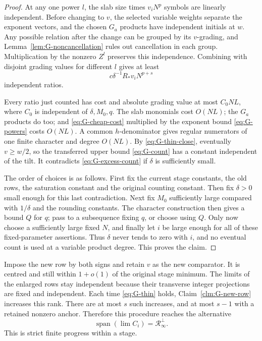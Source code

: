 \begin{proof}
At any one power $l$, the slab size times $v_iN^p$ symbols are linearly
independent.  Before changing to $v$, the selected variable weights
separate the exponent vectors, and the chosen $G_a$ products have
independent initials at $w$.  Any possible relation after the change
can be grouped by its $v$-grading, and
Lemma~\ref{lem:G-noncancellation} rules out cancellation in each group.
Multiplication by the nonzero $Z^l$ preserves this independence.
Combining with disjoint grading values for different $l$ gives at least
\begin{equation}\label{eq:G-excess-count}
                     c\delta^{-1}R_*v_iN^{p+s}
\end{equation}
independent ratios.

Every ratio just counted has cost and absolute grading value at most
$C_0NL$, where $C_0$ is independent of $\delta,M_0,q$.  The slab
monomials cost $O(NL)$; the $G_a$ products do too; and
\eqref{eq:G-cheap-cost} multiplied by the exponent bound
\eqref{eq:G-powers} costs $O(NL)$.  A common $h$-denominator gives
regular numerators of one finite character and degree $O(NL)$.
By \eqref{eq:G-thin-close}, eventually $v\ge w/2$, so the transferred
upper bound \eqref{eq:G-count} has a constant independent of the tilt.
It contradicts \eqref{eq:G-excess-count} if $\delta$ is sufficiently
small.

The order of choices is as follows.  First fix the current stage
constants, the old rows, the saturation constant and the original
counting constant.  Then fix $\delta>0$ small enough for this last
contradiction.  Next fix $M_0$ sufficiently large compared with
$1/\delta$ and the rounding constants.  The character construction then
gives a bound $Q$ for $q$; pass to a subsequence fixing $q$, or choose
using $Q$.  Only now choose a sufficiently large fixed $N$, and finally
let $i$ be large enough for all of these fixed-parameter assertions.
Thus $\delta$ never tends to zero with $i$, and no eventual count is
used at a variable product degree.  This proves the claim.
\end{proof}

Impose the new row by both signs and retain $v$ as the new comparator.
It is centred and still within $1+o(1)$ of the original stage minimum.
The limits of the enlarged rows stay independent because their
transverse integer projections are fixed and independent.  Each time
\eqref{eq:G-thin} holds, Claim~\ref{clm:G-new-row} increases this rank.
There are at most $s$ such increases, and at most $s-1$ with a retained
nonzero anchor.  Therefore this procedure reaches the alternative
\begin{equation}\label{eq:G-full-span}
                    \operatorname{span}(\lim C_i)
                    =\mathcal R_\infty^\perp.
\end{equation}
This is strict finite progress within a stage.

